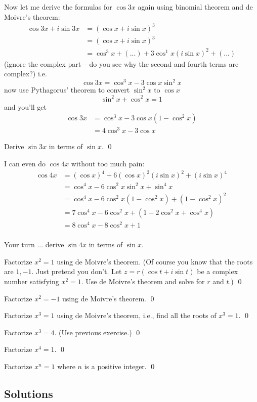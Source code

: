 Now let me derive the formulas for $\cos 3x$
again using binomial theorem and de Moivre's theorem:
\begin{align*}
\cos 3x + i \sin 3x
&= (\cos x + i \sin x)^3 \\
&= (\cos x + i \sin x)^3 \\
&= \cos^3 x + (...) + 3\cos^1 x (i\sin x)^2 + (...)
\end{align*}
(ignore the complex part -- do you see why the second and fourth
terms are complex?)
i.e.
\[
\cos 3x = \cos^3 x - 3\cos x \sin^2 x
\]
now use Pythagorus' theorem to convert $\sin^2 x$ to $\cos x$
\[
\sin^2 x + \cos^2 x = 1
\]
and you'll get
\begin{align*}
\cos 3x
&= \cos^3 x - 3\cos x (1-\cos^2 x) \\
&= 4\cos^3 x - 3 \cos x
\end{align*}

\begin{ex}
  Derive $\sin 3x$ in terms of $\sin x$.
  \qed
\end{ex}

I can even do $\cos 4x$ without too much pain:
\begin{align*}
\cos 4x 
&= (\cos x)^4 + 6(\cos x)^2(i\sin x)^2 + (i\sin x)^4 \\
&= \cos^4 x - 6\cos^2 x\sin^2 x + \sin^4 x \\
&= \cos^4 x - 6\cos^2 x(1 - \cos^2 x) + (1 - \cos^2 x)^2 \\
&= 7\cos^4 x - 6\cos^2 x + (1 - 2\cos^2 x + \cos^4 x) \\
&= 8\cos^4 x - 8 \cos^2 x + 1 \\
\end{align*}

\begin{ex}
Your turn ... derive $\sin 4x$ in terms of $\sin x$.
\end{ex}

\begin{ex}
  Factorize $x^2 = 1$ using de Moivre's theorem.
  (Of course you know that the roots are $1, -1$.
  Just pretend you don't.
  Let $z = r (\cos t + i \sin t)$ be a complex
  number satisfying $x^2 = 1$.
  Use de Moivre's theorem and solve for $r$ and $t$.)
  \qed
\end{ex}

\begin{ex}
  Factorize $x^2 = -1$ using de Moivre's theorem.
  \qed
\end{ex}

\begin{ex}
  Factorize $x^3 = 1$ using de Moivre's theorem, i.e.,
  find all the roots of $x^3 = 1$.
  \qed
\end{ex}

\begin{ex}
  Factorize $x^3 = 4$.
  (Use previous exercise.)
  \qed
\end{ex}

\begin{ex}
  Factorize $x^4 = 1$.
  \qed
\end{ex}

\begin{ex}
  Factorize $x^n = 1$ where $n$ is a positive integer.
  \qed
\end{ex}

\newpage
\subsection*{Solutions}

